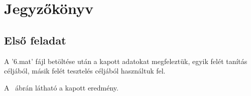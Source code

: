 \chapter{Jegyzőkönyv}

\section{Első feladat}
A ’6.mat’ fájl betöltése után a kapott adatokat megfeleztük, egyik felét tanítás céljából, másik felét tesztelés céljából használtuk fel.

\label{Matlab1}

A ~ábrán látható a kapott eredmény.

